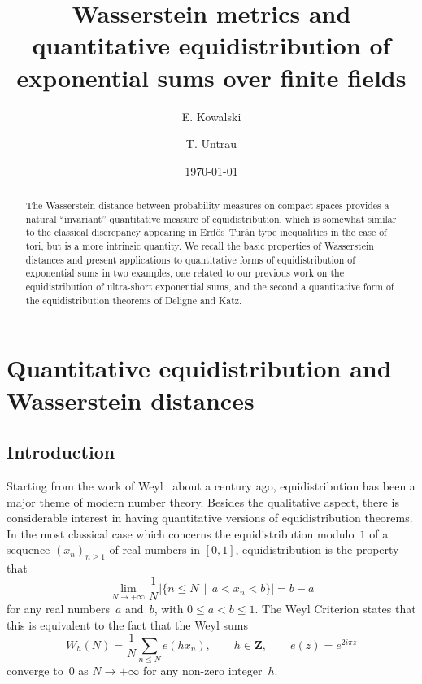 \documentclass[12pt]{amsart}
\renewcommand{\leq}{\leqslant}
\renewcommand{\geq}{\geqslant}
\newcommand{\Zz}{\mathbf{Z}}
\theoremstyle{plain}
\theoremstyle{remark}
\theoremstyle{definition}
\renewcommand{\geq}{\geqslant}
\renewcommand{\leq}{\leqslant}
\begin{document}
\title{Wasserstein metrics and quantitative equidistribution of
  exponential sums over finite fields}

\author{E. Kowalski}
\address{ETH Z\"urich -- D-MATH\\
  R\"amistrasse 101\\
  8092 Z\"urich\\
  Switzerland} 

\author{T. Untrau}
\address{Univ Rennes, CNRS, IRMAR - UMR 6625, F-35000 Rennes, France} 

\date{\today} 



\begin{abstract}
  The Wasserstein distance between probability measures on compact
  spaces provides a natural \enquote{invariant} quantitative measure of
  equidistribution, which is somewhat similar to the classical
  discrepancy appearing in Erd\H os--Turán type inequalities in the
  case of tori, but is a more intrinsic quantity.  We recall the basic
  properties of Wasserstein distances and present applications to
  quantitative forms of equidistribution of exponential sums in two
  examples, one related to our previous work on the equidistribution of
  ultra-short exponential sums, and the second a quantitative form of
  the equidistribution theorems of Deligne and Katz.
\end{abstract}

\maketitle
\setcounter{tocdepth}{1}

\tableofcontents

\section{Quantitative equidistribution and Wasserstein distances}

\subsection{Introduction}

Starting from the work of Weyl~\cite{weyl} about a century ago,
equidistribution has been a major theme of modern number theory.
Besides the qualitative aspect, there is considerable interest in having
quantitative versions of equidistribution theorems. In the most
classical case which concerns the equidistribution modulo~$1$ of a
sequence $(x_n)_{n\geq 1}$ of real numbers in $[0,1]$, equidistribution
is the property that
\begin{equation}\label{eq-equi}
  \lim_{N\to+\infty}\frac{1}{N} |\{n\leq N\,\mid\, a<x_n<b\}|=b-a
\end{equation}
for any real numbers~$a$ and~$b$, with $0\leq a<b\leq 1$. The Weyl
Criterion states that this is equivalent to the fact that the Weyl sums
\[
  W_h(N)=\frac{1}{N}\sum_{n\leq N}e(hx_n),\quad\quad h\in\Zz,\quad\quad
  e(z)=e^{2i\pi z}
\]
converge to~$0$ as $N\to +\infty$ for any non-zero integer~$h$.
\end{document}
